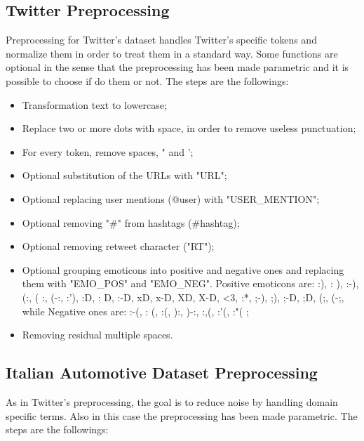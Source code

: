\subsection{Twitter Preprocessing}

Preprocessing for Twitter's dataset handles Twitter's specific tokens and normalize them in order to treat them in a standard way. Some functions are optional in the sense that the preprocessing has been made parametric and it is possible to choose if do them or not. The steps are the followings:

\begin{itemize}
	\item Transformation text to lowercase;
	\item Replace two or more dots with space, in order to remove useless punctuation;
	\item For every token, remove spaces, " and ';
	\item Optional substitution of the URLs with "URL";
	\item Optional replacing user mentions (@user) with "USER\_MENTION";
	\item Optional removing "\#" from hashtags (\#hashtag);
	\item Optional removing retweet character ("RT");
	\item Optional grouping emoticons into positive and negative ones and replacing them with "EMO\_POS" and "EMO\_NEG". Positive emoticons are: :), : ), :-), (:, ( :, (-:, :'), :D, : D, :-D, xD, x-D, XD, X-D, <3, :*, ;-), ;), ;-D, ;D, (;,  (-;, while Negative ones are: :-(, : (, :(, ):, )-:, :,(, :'(, :"( ;
	\item Removing residual multiple spaces.
\end{itemize}



\subsection{Italian Automotive Dataset Preprocessing}

As in Twitter's preprocessing, the goal is to reduce noise by handling domain specific terms. Also in this case the preprocessing has been made parametric. The steps are the followings:


